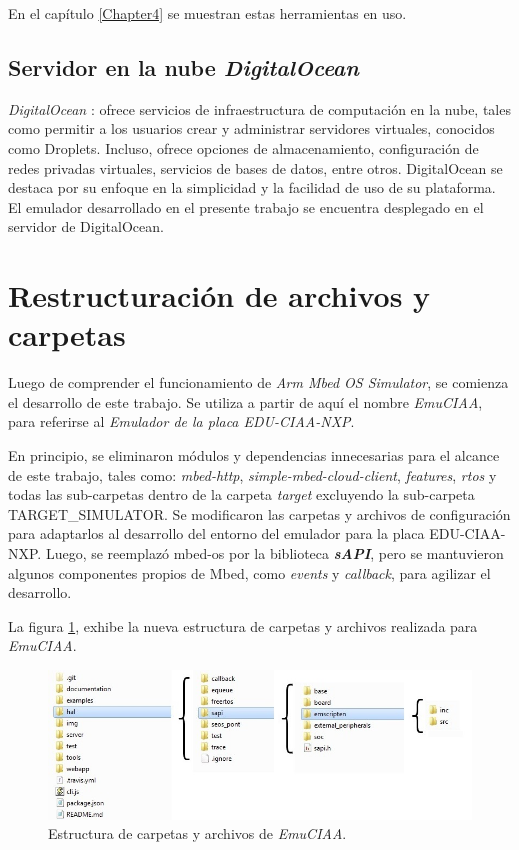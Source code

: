 En el capítulo \ref{Chapter4} se muestran estas herramientas en uso.

\subsection{Servidor en la nube \textit{DigitalOcean}}
\label{sec:DigitalOcean}

\textit{DigitalOcean} \citep{DigitalOcean}: ofrece servicios de infraestructura de computación en la nube, tales como permitir a los usuarios crear y administrar servidores virtuales, conocidos como Droplets. Incluso, ofrece opciones de almacenamiento, configuración de redes privadas virtuales, servicios de bases de datos, entre otros. DigitalOcean se destaca por su enfoque en la simplicidad y la facilidad de uso de su plataforma. El emulador desarrollado en el presente trabajo se encuentra desplegado en el servidor de DigitalOcean.


\section{Restructuración de archivos y carpetas}

Luego de comprender el funcionamiento de \textit{Arm Mbed OS Simulator}, se comienza el desarrollo de este trabajo. Se utiliza a partir de aquí el nombre \textit{EmuCIAA}, para referirse al \textit{Emulador de la placa EDU-CIAA-NXP}.

En principio, se eliminaron módulos y dependencias innecesarias para el alcance de este trabajo, tales como: \textit{mbed-http}, \textit{simple-mbed-cloud-client}, \textit{features}, \textit{rtos} y todas las sub-carpetas dentro de la carpeta \textit{target} excluyendo la sub-carpeta TARGET\_SIMULATOR. Se modificaron las carpetas y archivos de configuración para adaptarlos al desarrollo del entorno del emulador para la placa EDU-CIAA-NXP. Luego, se reemplazó \textquotedbl mbed-os\textquotedbl{}  por la biblioteca \textit{\textbf{sAPI}}, pero se mantuvieron algunos componentes propios de Mbed, como \textit{events} y \textit{callback}, para agilizar el desarrollo.

La figura \ref{fig:estructuraCiaa}, exhibe la nueva estructura de carpetas y archivos realizada para \textit{EmuCIAA}.

\begin{figure}[ht]
	\centering
	\includegraphics[scale=.55]{./Figures/estructuraCiaa.jpg}
	\caption{Estructura de carpetas y archivos de \textit{EmuCIAA}.}
	\label{fig:estructuraCiaa}
\end{figure}

